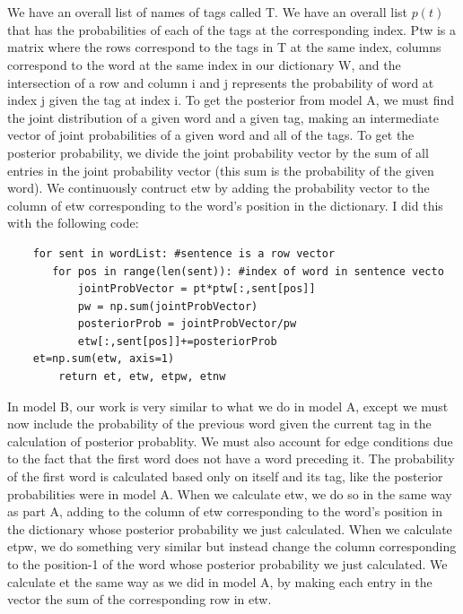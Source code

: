 \documentclass{article}
\begin{document}
\section{}
We have an overall list of names of tags called T.  We have an overall list $p(t)$ that has the probabilities of each of the tags at the corresponding index.  Ptw is a matrix where the rows correspond to the tags in T at the same index, columns correspond to the word at the same index in our dictionary W, and the intersection of a row and column i and j represents the probability of word at index j given the tag at index i.  \newline To get the posterior from model A, we must find the joint distribution of a given word and a given tag, making an intermediate vector of joint probabilities of a given  word and all of the tags.  To get the posterior probability, we divide the joint probability vector by the sum of all entries in the joint probability vector (this sum is the probability of the given word). We continuously contruct etw by adding the probability vector to the column of etw corresponding to the word's position in the dictionary. I did this with the following code:
\begin{verbatim}
	for sent in wordList: #sentence is a row vector
	   for pos in range(len(sent)): #index of word in sentence vecto    
	       jointProbVector = pt*ptw[:,sent[pos]]
	       pw = np.sum(jointProbVector)
	       posteriorProb = jointProbVector/pw		
	       etw[:,sent[pos]]+=posteriorProb
	et=np.sum(etw, axis=1)		
        return et, etw, etpw, etnw
\end{verbatim}
In model B, our work is very similar to what we do in model A, except we must now include the probability of the previous word given the current tag in the calculation of posterior probablity.  We must also account for edge conditions due to the fact that the first word does not have a word preceding it.  The probability of the first word is calculated based only on itself and its tag, like the posterior probabilities were in model A. When we calculate etw, we do so in the same way as part A, adding to the column of etw corresponding to the word's position in the dictionary whose posterior probability we just calculated.  When we calculate etpw, we do something very similar but instead change the column corresponding to the position-1 of the word whose posterior probability we just calculated. We calculate et the same way as we did in model A, by making each entry in the vector the sum of the corresponding row in etw.
\end{document}
